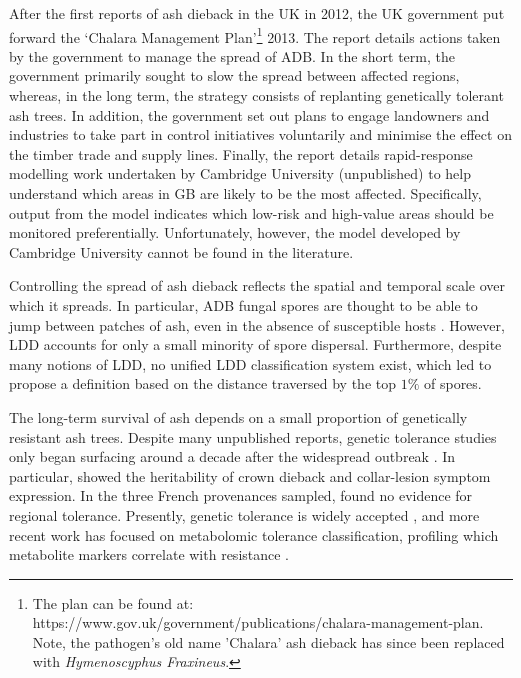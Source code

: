 After the first reports of ash dieback in the UK in 2012, the UK government put forward the `Chalara Management Plan'\footnote{The plan can be found at: https://www.gov.uk/government/publications/chalara-management-plan. Note, the pathogen's old name 'Chalara' ash dieback has since been replaced with \textit{Hymenoscyphus Fraxineus}.} 2013. The report details actions taken by the government to manage the spread of ADB. In the short term, the government primarily sought to slow the spread between affected regions, whereas, in the long term, the strategy consists of replanting genetically tolerant ash trees. In addition, the government set out plans to engage landowners and industries to take part in control initiatives voluntarily and minimise the effect on the timber trade and supply lines. 	Finally, the report details rapid-response modelling work undertaken by Cambridge University (unpublished) to help understand which areas in GB are likely to be the most affected. 
Specifically, output from the model indicates which low-risk and high-value areas should be monitored preferentially. Unfortunately, however, the model developed by Cambridge University cannot be found in the literature.

Controlling the spread of ash dieback reflects the spatial and temporal scale over which it spreads. In particular, ADB fungal spores are thought to be able to jump between patches of ash, even in the absence of susceptible hosts \cite{wingen2013long}.
However, LDD accounts for only a small minority of spore dispersal. Furthermore, despite many notions of LDD, no unified LDD classification system exist, which led \cite{golan2017long} to propose a definition based on the distance traversed by the top $1\%$ of spores.

The long-term survival of ash depends on a small proportion of genetically resistant ash trees.
Despite many unpublished reports, genetic tolerance studies only began surfacing around a decade
after the widespread outbreak \cite{kjaer2012adaptive, stener2013clonal, mckinney2014ash}.
In particular, \cite{doi:10.1094/PHYTO-11-15-0284-R} showed the heritability of crown dieback and
collar-lesion symptom expression. In the three French provenances sampled,
\cite{doi:10.1094/PHYTO-11-15-0284-R} found no evidence for regional tolerance.
Presently, genetic tolerance is widely accepted \cite{havrdova2016differences, skovsgaard2017silvicultural},
and more recent work has focused on metabolomic tolerance classification,
profiling which metabolite markers correlate with resistance 
\cite{nemesio2020canditate, nemesio2020metabolomics, sidda2020diversity, chaudhary2020identification}.

